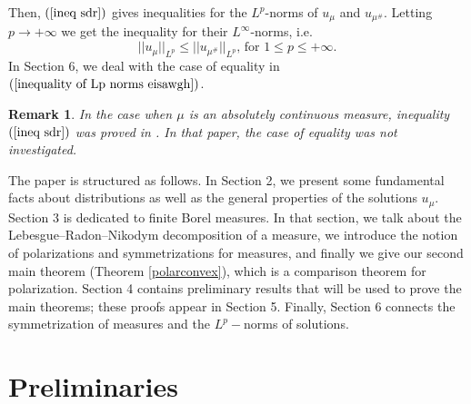 \documentclass[11pt]{amsart}
\newtheorem{remark}[theorem]{Remark}
\numberwithin{equation}{section}
\begin{document}
Then, \((\ref{ineq sdr})\) gives inequalities for the \(L^p\)-norms of \(u_\mu\) and \(u_{\mu^\#}\). Letting \(p\to+\infty\) we get the inequality for their \(L^\infty\)-norms, i.e.
\begin{equation}\label{inequality of Lp norms eisawgh}
||u_\mu||_{L^p}\leq||u_{\mu^\#}||_{L^p} \text{, for }1\leq p\leq+\infty.
\end{equation}
In Section 6, we deal with the case of equality in \((\ref{inequality of Lp norms eisawgh})\).
\begin{remark}
\textnormal{ In the case when \(\mu\) is an absolutely continuous measure, inequality \((\ref{ineq sdr})\) was proved in \cite{Langford}. In that paper, the case of equality was not investigated.}
\end{remark}
The paper is structured as follows. In Section 2, we present some fundamental facts about distributions as well as the general properties of the solutions \(u_\mu.\) Section 3 is dedicated to finite Borel measures. In that section, we talk about the Lebesgue--Radon--Nikodym decomposition of a measure, we introduce the notion of polarizations and symmetrizations for measures, and finally we give our second main theorem (Theorem \ref{polarconvex}), which is a comparison theorem for polarization. Section 4 contains preliminary results that will be used to prove the main theorems; these proofs appear in Section 5. Finally, Section 6 connects the symmetrization of measures and the \(L^p-\)norms of solutions.
\section{Preliminaries}
\end{document}

